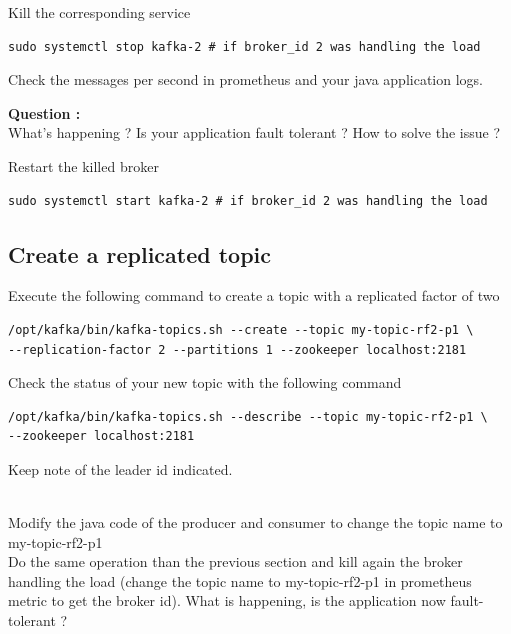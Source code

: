 \documentclass{article}
\newcounter{question}
\newenvironment{question}
    { \begin{mdframed}[backgroundcolor=gray!20] \textbf{Question \arabic{question} : } \stepcounter{question} \\}
    {  \end{mdframed}}
\newenvironment{code}
    { \begin{mdframed} }    {  \end{mdframed}}
\begin{document}
Kill the corresponding service
\begin{code}
    \begin{verbatim}
sudo systemctl stop kafka-2 # if broker_id 2 was handling the load \end{verbatim}
\end{code}


Check the messages per second in prometheus and your java application logs.

\begin{question}
 What's happening ? Is your application fault tolerant ? How to solve the issue ? 
\end{question}


Restart the killed broker 
\begin{code}
    \begin{verbatim}
sudo systemctl start kafka-2 # if broker_id 2 was handling the load \end{verbatim}
\end{code}
\subsection{Create a replicated topic}
Execute the following command to create a topic with a replicated factor of two

\begin{code}
    \begin{verbatim}
/opt/kafka/bin/kafka-topics.sh --create --topic my-topic-rf2-p1 \
--replication-factor 2 --partitions 1 --zookeeper localhost:2181 \end{verbatim}
\end{code}


Check the status of your new topic with the following command
\begin{code}
    \begin{verbatim}
/opt/kafka/bin/kafka-topics.sh --describe --topic my-topic-rf2-p1 \
--zookeeper localhost:2181 \end{verbatim}
\end{code}

Keep note of the leader id indicated.


\\
Modify the java code of the producer and consumer to change the topic name to my-topic-rf2-p1
\\


Do the same operation than the previous section and kill again the broker handling the load (change the topic name to my-topic-rf2-p1 in prometheus metric to get the broker id). What is happening, is the application now fault-tolerant ? 
\\
\end{document}
